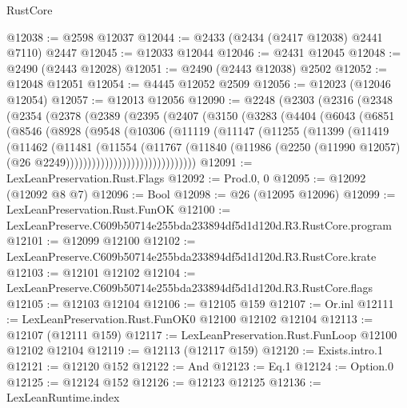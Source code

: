 \begin{lexlean}{RustCore}
\begin{coremodule}
@12038 := @2598 @12037
@12044 := @2433 (@2434 (@2417 @12038) @2441 @7110) @2447
@12045 := @12033 @12044
@12046 := @2431 @12045
@12048 := @2490 (@2443 @12028)
@12051 := @2490 (@2443 @12038) @2502
@12052 := @12048 @12051
@12054 := @4445 @12052 @2509
@12056 := @12023 (@12046 @12054)
@12057 := @12013 @12056
@12090 := @2248
    (@2303
      (@2316
        (@2348
          (@2354
            (@2378
              (@2389
                (@2395
                  (@2407
                    (@3150
                      (@3283
                        (@4404
                          (@6043
                            (@6851
                              (@8546
                                (@8928
                                  (@9548
                                    (@10306
                                      (@11119
                                        (@11147
                                          (@11255
                                            (@11399
                                              (@11419
                                                (@11462
                                                  (@11481
                                                    (@11554
                                                      (@11767
                                                        (@11840
                                                          (@11986
                                                            (@2250
                                                              (@11990 @12057)
                                                              (@26
                                                                @2249))))))))))))))))))))))))))))))
@12091 := LexLeanPreservation.Rust.Flags
@12092 := Prod.{0, 0}
@12095 := @12092 (@12092 @8 @7)
@12096 := Bool
@12098 := @26 (@12095 @12096)
@12099 := LexLeanPreservation.Rust.FunOK
@12100 := LexLeanPreserve.C609b50714e255bda233894df5d1d120d.R3.RustCore.program
@12101 := @12099 @12100
@12102 := LexLeanPreserve.C609b50714e255bda233894df5d1d120d.R3.RustCore.krate
@12103 := @12101 @12102
@12104 := LexLeanPreserve.C609b50714e255bda233894df5d1d120d.R3.RustCore.flags
@12105 := @12103 @12104
@12106 := @12105 @159
@12107 := Or.inl
@12111 := LexLeanPreservation.Rust.FunOK0 @12100 @12102 @12104
@12113 := @12107 (@12111 @159)
@12117 := LexLeanPreservation.Rust.FunLoop @12100 @12102 @12104
@12119 := @12113 (@12117 @159)
@12120 := Exists.intro.{1}
@12121 := @12120 @152
@12122 := And
@12123 := Eq.{1}
@12124 := Option.{0}
@12125 := @12124 @152
@12126 := @12123 @12125
@12136 := LexLeanRuntime.index

\end{coremodule}
\end{lexlean}
